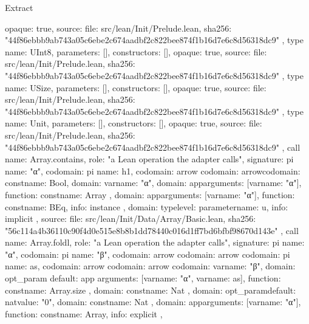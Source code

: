 \begin{lexlean}{Extract}
\begin{toolingmodule}
{{      opaque: true,
      source: {
        file: src/lean/Init/Prelude.lean,
        sha256: "44f86ebbb9ab743a05c6ebe2c674aadbf2c822bee874f1b16d7e6c8d56318dc9"
      }
    },
    type{
      name: UInt8,
      parameters: [],
      constructors: [],
      opaque: true,
      source: {
        file: src/lean/Init/Prelude.lean,
        sha256: "44f86ebbb9ab743a05c6ebe2c674aadbf2c822bee874f1b16d7e6c8d56318dc9"
      }
    },
    type{
      name: USize,
      parameters: [],
      constructors: [],
      opaque: true,
      source: {
        file: src/lean/Init/Prelude.lean,
        sha256: "44f86ebbb9ab743a05c6ebe2c674aadbf2c822bee874f1b16d7e6c8d56318dc9"
      }
    },
    type{
      name: Unit,
      parameters: [],
      constructors: [],
      opaque: true,
      source: {
        file: src/lean/Init/Prelude.lean,
        sha256: "44f86ebbb9ab743a05c6ebe2c674aadbf2c822bee874f1b16d7e6c8d56318dc9"
      }
    },
    call{
      name: Array.contains,
      role: "a Lean operation the adapter calls",
      signature: pi{
        name: "α",
        codomain: pi{
          name: h1,
          codomain: arrow{
            codomain: arrow{codomain: const{name: Bool}, domain: var{name: "α"}},
            domain: app{arguments: [var{name: "α"}], function: const{name: Array}}
          },
          domain: app{arguments: [var{name: "α"}], function: const{name: BEq}},
          info: instance
        },
        domain: type{level: parameter{name: u}},
        info: implicit
      },
      source: {
        file: src/lean/Init/Data/Array/Basic.lean,
        sha256: "56c114a4b36110c90f4d0e515e8b8b1dd78440c016d1ff7bd6bfbf98670d143e"
      }
    },
    call{
      name: Array.foldl,
      role: "a Lean operation the adapter calls",
      signature: pi{
        name: "α",
        codomain: pi{
          name: "β",
          codomain: arrow{
            codomain: arrow{
              codomain: pi{
                name: as,
                codomain: arrow{
                  codomain: arrow{
                    codomain: var{name: "β"},
                    domain: opt_param{
                      default: app{
                        arguments: [var{name: "α"}, var{name: as}],
                        function: const{name: Array.size}
                      },
                      domain: const{name: Nat}
                    }
                  },
                  domain: opt_param{default: nat{value: "0"}, domain: const{name: Nat}}
                },
                domain: app{arguments: [var{name: "α"}], function: const{name: Array}},
                info: explicit
              },
}}}}}}
\end{toolingmodule}
\end{lexlean}
